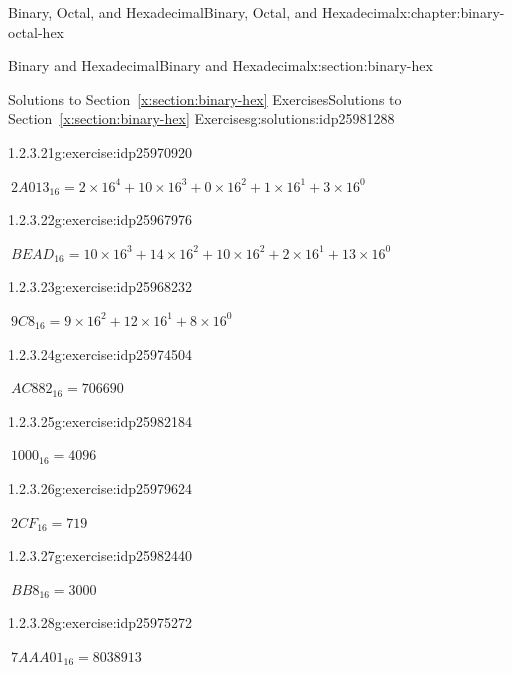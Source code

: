 \documentclass[twoside,10pt,]{book}
\newcommand{\xreffont}{\relax}
\numberwithin{equation}{section}
\begin{document}
\begin{chapterptx}{Binary, Octal, and Hexadecimal}{}{Binary, Octal, and Hexadecimal}{}{}{x:chapter:binary-octal-hex}
\begin{sectionptx}{Binary and Hexadecimal}{}{Binary and Hexadecimal}{}{}{x:section:binary-hex}
\begin{solutions-subsection}{Solutions to Section~{\xreffont\ref*{x:section:binary-hex}} Exercises}{}{Solutions to Section~{\xreffont\ref*{x:section:binary-hex}} Exercises}{}{}{g:solutions:idp25981288}
\begin{exercisegroup}
\begin{divisionsolutioneg}{1.2.3.21}{}{g:exercise:idp25970920}%
\par\smallskip%
\noindent\hypertarget{g:solution:idp25972968-main}{}\(\ 2A013_{16}=2\times16^4+10\times16^3+0\times16^2+1\times16^1+3\times16^0\)\end{divisionsolutioneg}%
\begin{divisionsolutioneg}{1.2.3.22}{}{g:exercise:idp25967976}%
\par\smallskip%
\noindent\hypertarget{g:solution:idp25969512-main}{}\(\ BEAD_{16}=10\times16^3+14\times16^2+10\times16^2+2\times16^1+13\times16^0\)\end{divisionsolutioneg}%
\begin{divisionsolutioneg}{1.2.3.23}{}{g:exercise:idp25968232}%
\par\smallskip%
\noindent\hypertarget{g:solution:idp25973352-main}{}\(\ 9C8_{16}=9\times16^2+12\times16^1+8\times16^0\)\end{divisionsolutioneg}%
\end{exercisegroup}
\par\medskip\noindent
\begin{exercisegroup}
\begin{divisionsolutioneg}{1.2.3.24}{}{g:exercise:idp25974504}%
\par\smallskip%
\noindent\hypertarget{g:solution:idp25968744-main}{}\(\ AC882_{16}=706690\)\end{divisionsolutioneg}%
\begin{divisionsolutioneg}{1.2.3.25}{}{g:exercise:idp25982184}%
\par\smallskip%
\noindent\hypertarget{g:solution:idp25978088-main}{}\(\ 1000_{16}=4096\)\end{divisionsolutioneg}%
\begin{divisionsolutioneg}{1.2.3.26}{}{g:exercise:idp25979624}%
\par\smallskip%
\noindent\hypertarget{g:solution:idp25975784-main}{}\(\ 2CF_{16}=719\)\end{divisionsolutioneg}%
\begin{divisionsolutioneg}{1.2.3.27}{}{g:exercise:idp25982440}%
\par\smallskip%
\noindent\hypertarget{g:solution:idp25979752-main}{}\(\ BB8_{16}=3000\)\end{divisionsolutioneg}%
\begin{divisionsolutioneg}{1.2.3.28}{}{g:exercise:idp25975272}%
\par\smallskip%
\noindent\hypertarget{g:solution:idp25982696-main}{}\(\ 7AAA01_{16}=8038913\)\end{divisionsolutioneg}%

\end{exercisegroup}
\end{solutions-subsection}
\end{sectionptx}
\end{chapterptx}
\end{document}
